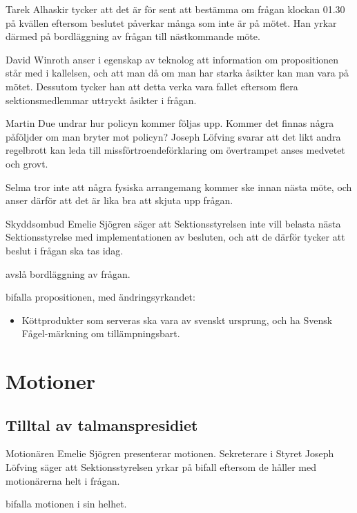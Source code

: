 \documentclass[hidelinks]{sektionsmote}
\begin{document}
Tarek Alhaskir tycker att det är för sent att bestämma om frågan klockan 01.30 på kvällen eftersom beslutet påverkar många som inte är på mötet.
Han yrkar därmed på bordläggning av frågan till nästkommande möte.

David Winroth anser i egenskap av teknolog att information om propositionen står med i kallelsen, och att man då om man har starka åsikter kan man vara på mötet. Dessutom tycker han att detta verka vara fallet eftersom flera sektionsmedlemmar uttryckt åsikter i frågan.

Martin Due undrar hur policyn kommer följas upp.
Kommer det finnas några påföljder om man bryter mot policyn?
Joseph Löfving svarar att det likt andra regelbrott kan leda till missförtroendeförklaring om övertrampet anses medvetet och grovt.

Selma tror inte att några fysiska arrangemang kommer ske innan nästa möte, och anser därför att det är lika bra att skjuta upp frågan.

Skyddsombud Emelie Sjögren säger att Sektionsstyrelsen inte vill belasta nästa Sektionsstyrelse med implementationen av besluten, och att de därför tycker att beslut i frågan ska tas idag.

\begin{beslut}
  \item avslå bordläggning av frågan.
  \item bifalla propositionen, med ändringsyrkandet:
  \begin{itemize}
    \item Köttprodukter som serveras ska vara av svenskt ursprung, och ha Svensk Fågel-märkning om tillämpningsbart.
  \end{itemize}
\end{beslut}


\section{Motioner}
\subsection{Tilltal av talmanspresidiet}
Motionären Emelie Sjögren presenterar motionen. %
Sekreterare i Styret Joseph Löfving säger att Sektionsstyrelsen yrkar på bifall eftersom de håller med motionärerna helt i frågan.

\begin{beslut}
  \item bifalla motionen i sin helhet.
\end{beslut}
\end{document}
